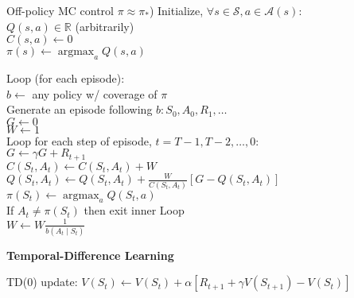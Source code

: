 \documentclass[twocolumn]{article}
\DeclareMathOperator*{\argmax}{argmax}
\begin{document}
\begin{mydef}{Off-policy MC control $\pi \approx \pi_*$)}{}
    Initialize, $\forall s \in \mathcal S, a \in \mathcal A(s)$: \\
        \hspace*{2em}$Q(s,a) \in \mathbb R$ (arbitrarily) \\
        \hspace*{2em}$C(s,a) \leftarrow 0$ \\
        \hspace*{2em}$\pi(s) \leftarrow \argmax_a Q(s, a)$
    
        Loop (for each episode): \\
            \hspace*{2em}$b\leftarrow$ any policy w/ coverage of $\pi$ \\
            \hspace*{2em}Generate an episode following $b: S_0, A_0, R_1, \dots$ \\
            \hspace*{2em}$G \leftarrow 0$ \\
            \hspace*{2em}$W \leftarrow 1$ \\
            \hspace*{2em}Loop for each step of episode, $t = T-1, T-2, \dots, 0$: \\
                \hspace*{4em}$G \leftarrow \gamma G + R_{t+1}$ \\
                \hspace*{4em}$C(S_t, A_t) \leftarrow C(S_t, A_t) + W$ \\
                \hspace*{4em}$Q(S_t, A_t) \leftarrow Q(S_t, A_t) + \frac{W}{C(S_t, A_t)} [G - Q(S_t, A_t)]$ \\
                \hspace*{4em}$\pi(S_t) \leftarrow \argmax_a Q(S_t, a)$ \\
                \hspace*{4em}If $A_t \neq \pi(S_t)$ then exit inner Loop \\
                \hspace*{4em}$W \leftarrow W \frac{1}{b(A_t \mid S_t)}$
\end{mydef}

\dotfill

\textbf{Temporal-Difference Learning}

TD(0) update: $V(S_t) \leftarrow V(S_t) + \alpha [R_{t+1} + \gamma V(S_{t+1}) - V(S_t)]$
\end{document}
